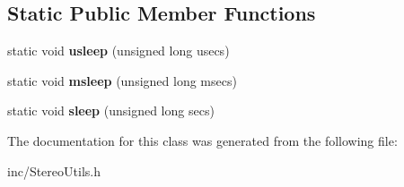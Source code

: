 \subsection*{Static Public Member Functions}
\begin{DoxyCompactItemize}
\item 
static void {\bfseries usleep} (unsigned long usecs)\hypertarget{class_stereo_utils_1_1_sleeper_a72284b05dee22ca27a3a6c7d113b6508}{}\label{class_stereo_utils_1_1_sleeper_a72284b05dee22ca27a3a6c7d113b6508}

\item 
static void {\bfseries msleep} (unsigned long msecs)\hypertarget{class_stereo_utils_1_1_sleeper_ad0987958994e04889ee2b8bea3e809d6}{}\label{class_stereo_utils_1_1_sleeper_ad0987958994e04889ee2b8bea3e809d6}

\item 
static void {\bfseries sleep} (unsigned long secs)\hypertarget{class_stereo_utils_1_1_sleeper_a92c7a577a9435a7fd8cf431b08d03aef}{}\label{class_stereo_utils_1_1_sleeper_a92c7a577a9435a7fd8cf431b08d03aef}

\end{DoxyCompactItemize}


The documentation for this class was generated from the following file\+:\begin{DoxyCompactItemize}
\item 
inc/Stereo\+Utils.\+h\end{DoxyCompactItemize}
